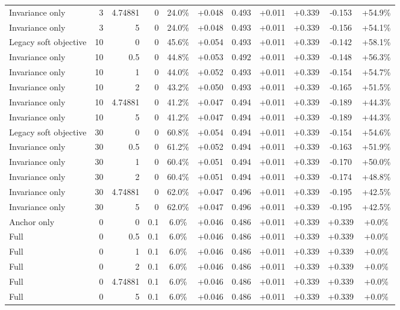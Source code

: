 \begin{table}[htbp]
\begin{tabular}{lrrrccccccc}
Invariance only & 3 & 4.74881 & 0 & 24.0\% & +0.048 & 0.493 & +0.011 & +0.339 & -0.153 & +54.9\% \\
Invariance only & 3 & 5 & 0 & 24.0\% & +0.048 & 0.493 & +0.011 & +0.339 & -0.156 & +54.1\% \\
Legacy soft objective & 10 & 0 & 0 & 45.6\% & +0.054 & 0.493 & +0.011 & +0.339 & -0.142 & +58.1\% \\
Invariance only & 10 & 0.5 & 0 & 44.8\% & +0.053 & 0.492 & +0.011 & +0.339 & -0.148 & +56.3\% \\
Invariance only & 10 & 1 & 0 & 44.0\% & +0.052 & 0.493 & +0.011 & +0.339 & -0.154 & +54.7\% \\
Invariance only & 10 & 2 & 0 & 43.2\% & +0.050 & 0.493 & +0.011 & +0.339 & -0.165 & +51.5\% \\
Invariance only & 10 & 4.74881 & 0 & 41.2\% & +0.047 & 0.494 & +0.011 & +0.339 & -0.189 & +44.3\% \\
Invariance only & 10 & 5 & 0 & 41.2\% & +0.047 & 0.494 & +0.011 & +0.339 & -0.189 & +44.3\% \\
Legacy soft objective & 30 & 0 & 0 & 60.8\% & +0.054 & 0.494 & +0.011 & +0.339 & -0.154 & +54.6\% \\
Invariance only & 30 & 0.5 & 0 & 61.2\% & +0.052 & 0.494 & +0.011 & +0.339 & -0.163 & +51.9\% \\
Invariance only & 30 & 1 & 0 & 60.4\% & +0.051 & 0.494 & +0.011 & +0.339 & -0.170 & +50.0\% \\
Invariance only & 30 & 2 & 0 & 60.4\% & +0.051 & 0.494 & +0.011 & +0.339 & -0.174 & +48.8\% \\
Invariance only & 30 & 4.74881 & 0 & 62.0\% & +0.047 & 0.496 & +0.011 & +0.339 & -0.195 & +42.5\% \\
Invariance only & 30 & 5 & 0 & 62.0\% & +0.047 & 0.496 & +0.011 & +0.339 & -0.195 & +42.5\% \\
Anchor only & 0 & 0 & 0.1 & 6.0\% & +0.046 & 0.486 & +0.011 & +0.339 & +0.339 & +0.0\% \\
Full & 0 & 0.5 & 0.1 & 6.0\% & +0.046 & 0.486 & +0.011 & +0.339 & +0.339 & +0.0\% \\
Full & 0 & 1 & 0.1 & 6.0\% & +0.046 & 0.486 & +0.011 & +0.339 & +0.339 & +0.0\% \\
Full & 0 & 2 & 0.1 & 6.0\% & +0.046 & 0.486 & +0.011 & +0.339 & +0.339 & +0.0\% \\
Full & 0 & 4.74881 & 0.1 & 6.0\% & +0.046 & 0.486 & +0.011 & +0.339 & +0.339 & +0.0\% \\
Full & 0 & 5 & 0.1 & 6.0\% & +0.046 & 0.486 & +0.011 & +0.339 & +0.339 & +0.0\% \\

\end{tabular}
\end{table}
